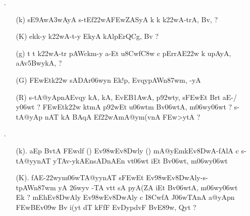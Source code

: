 \begin{itemize}
\item[{\dn \dnnum \rn{11}}.] \begin{itemize}

           \item[({\dn k})] {\dn {}s\2E\39Aw\3A3wAyA\2 s\2-tEf\322wA\3FEwZASyA\2 k\? k\? k\322wA-trA, Bv\?, {\rs ?\re}}
           
           \item[({\dn K})] {\dn ek\4k-y k\322wA-t-y\0 EkyA kAlpErQC\?g, Bv\? {\rs ?\re}}
            
           \item[({\dn g})] {\dn t\? t\? k\322wA-tr\? pAWckm-y a-Et u\38Cw\?f\4\3C8w\2 c pErrAE\322w\2\- k\? upAyA, aAv\35BwykA, {\rs ?\re}}
           
           \item[({\dn G})] {\dn \3FEwEtk\322w\2 sADAr\306wy\?n Ek!p, EvqypAWn\387wm, -yA} 
           
           \item[({\dn R})] {\dn s\2-tA@yApnAEvqy\? kA, kA, EvEB\31AwA, p\392wty, s\2\3FEwEt Brt\? aE-/\- y\306wt\? {\rs ?\re} \3FEwEtk\322w\2 ktmA\2 p\392wEt u\306wtm\2 Bv\306wtA, m\306wy\306wt\? {\rs ?\re} s\2-tA@yAp\- nAT{\rdt} kA BAqA Ef\322wAmA@ym(v\?nA \3FEw>ytA {\rs ?\re}}
           \end{itemize}

\item[{\dn \dnnum \rn{12}}.]\begin{itemize}
                \item[({\dn k}).] {\dn aEp BvtA\2 \3FEwd\?f\? {\rs (\re}{\dn \dnnum {}}{\rs )\re} Ev\398wEv\38Dwly\? {\rs (\re}{\dn \dnnum {}}{\rs )\re} mA@yEmk\-Ev\38DwA{\rs -\re}fAlA c s\2-tA@yynAT\?{\qvb} yTAv-ykAEn\break {}sADnAEn vt\0\306wt\? iEt Bv\306wt, m\306wy\306wt}
                
                \item[({\dn K}).] {\dn fAE-\322wym\306wTA@yynAT{\rdt} s\2\3FEwEt Ev\398wEv\38DwAly{\rs -\re}s\2-t\-pAWn\387wm\? yA \326wyv\- -TA vt\0t\?{\rs ,\re} sA pyA\0(ZA iEt Bv\306wtA, m\306wy\306wt\? Ek {\rs ?\re} mEhEv\38DwAly\? Ev\398wEv\38DwAly\? c I\38CwfA\2 J\306wTAnA a@yApn\2 \3FEwBEv\309w Bv\? i(y\?t\- dT\?{\qvb} kFfF EvD\?ypdvF BvE\389w, Qy\?t {\rs ?\re}}


\end{itemize}
\end{itemize}
